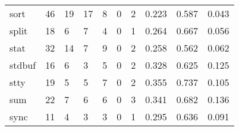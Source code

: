 \begin{longtable}{lp{2.0cm}p{2.0cm}p{2.0cm}p{2.0cm}p{2.0cm}p{2.0cm}p{2.0cm}p{2.0cm}p{2.0cm}}
sort      &                     46 &                                            19 &                                           17 &                                           8 &                                            0 &                                          2 &                                0.223 &                                  0.587 &                                0.043 \\
split     &                     18 &                                             6 &                                            7 &                                           4 &                                            0 &                                          1 &                                0.264 &                                  0.667 &                                0.056 \\
stat      &                     32 &                                            14 &                                            7 &                                           9 &                                            0 &                                          2 &                                0.258 &                                  0.562 &                                0.062 \\
stdbuf    &                     16 &                                             6 &                                            3 &                                           5 &                                            0 &                                          2 &                                0.328 &                                  0.625 &                                0.125 \\
stty      &                     19 &                                             5 &                                            5 &                                           7 &                                            0 &                                          2 &                                0.355 &                                  0.737 &                                0.105 \\
sum       &                     22 &                                             7 &                                            6 &                                           6 &                                            0 &                                          3 &                                0.341 &                                  0.682 &                                0.136 \\
sync      &                     11 &                                             4 &                                            3 &                                           3 &                                            0 &                                          1 &                                0.295 &                                  0.636 &                                0.091 \\

\end{longtable}
